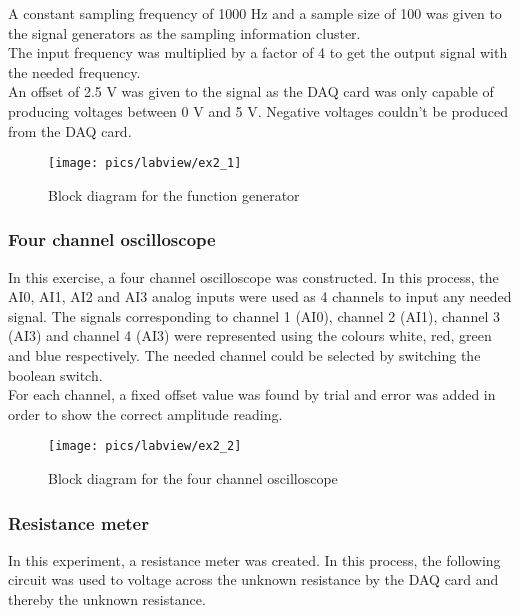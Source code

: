 \noindent
A constant sampling frequency of 1000 Hz and a sample size of 100 was given to the signal generators as the sampling information cluster. \\

\noindent
The input frequency was multiplied by a factor of 4 to get the output signal with the needed frequency.\\

\noindent
 An offset of 2.5 V was given to the signal as the DAQ card was only capable of producing voltages between 0 V and 5 V. Negative voltages couldn't be produced from the DAQ card.

\begin{figure}[!h]
	\centering
	\texttt{[image: pics/labview/ex2\_1]}
	\caption{Block diagram for the function generator}
	\label{fig:ex8}
\end{figure}

\pagebreak

\subsubsection{Four channel oscilloscope}

In this exercise, a four channel oscilloscope was constructed. In this process, the AI0, AI1, AI2 and AI3 analog inputs were  used as 4 channels to input any needed signal. The signals corresponding to channel 1 (AI0), channel 2 (AI1), channel 3 (AI3) and channel 4 (AI3) were represented using the colours white, red, green and blue respectively. The needed channel could be selected by switching the boolean switch.\\

\noindent
For each channel, a fixed offset value  was found by trial and error was added in order to show the correct amplitude reading. 

\begin{figure}[!h]
	\centering
	\texttt{[image: pics/labview/ex2\_2]}
	\caption{Block diagram for the four channel oscilloscope}
	\label{fig:ex9}
\end{figure}

\subsubsection{Resistance meter}

In this experiment, a resistance meter was created. In this process, the following circuit was used to voltage across the unknown resistance by the DAQ card and thereby the unknown resistance.

